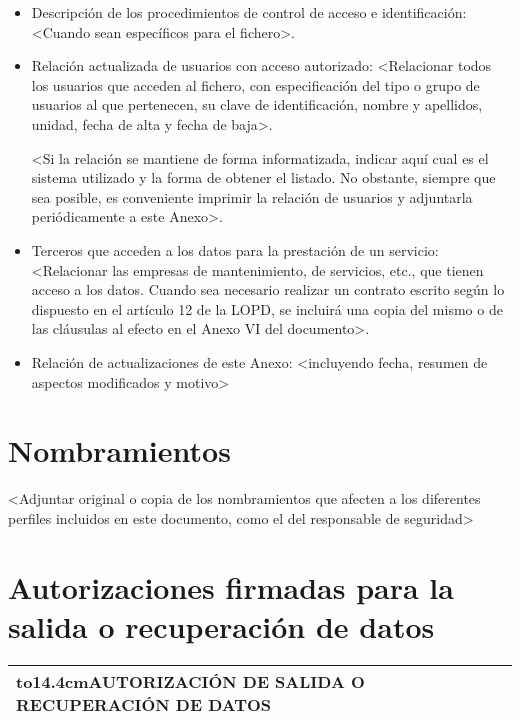 \documentclass[a4paper,11pt,bibtotoc,noliststotoc]{scrbook}
\begin{document}
\begin{itemize}
\item Descripción de los procedimientos de control de acceso e identificación: <Cuando sean específicos para el fichero>.

\item Relación actualizada de usuarios con acceso autorizado: <Relacionar todos los usuarios que acceden al fichero, con especificación del tipo o grupo de usuarios al que pertenecen, su clave de identificación, nombre y apellidos, unidad, fecha de alta y fecha de baja>.

<Si la relación se mantiene de forma informatizada, indicar aquí cual es el sistema utilizado y la forma de obtener el listado. No obstante, siempre que sea posible, es conveniente imprimir la relación de usuarios y adjuntarla periódicamente a este Anexo>.

\item Terceros que acceden a los datos para la prestación de un servicio: <Relacionar las empresas de mantenimiento, de servicios, etc., que tienen acceso a los datos. Cuando sea necesario realizar un contrato escrito según lo dispuesto en el artículo 12 de la LOPD, se incluirá una copia del mismo o de las cláusulas al efecto en el Anexo VI del documento>.

\item Relación de actualizaciones de este Anexo: <incluyendo fecha, resumen de aspectos modificados y motivo>

\end{itemize}










\chapter{Nombramientos}

<Adjuntar original o copia de los nombramientos que afecten a los diferentes perfiles
incluidos en este documento, como el del responsable de seguridad>







\chapter{Autorizaciones firmadas para la salida o recuperación de datos}


\begin{center}
\begin{supertabular}{|p{14cm}|}
	\hline
	\hbox to14.4cm{\hss AUTORIZACIÓN DE SALIDA O RECUPERACIÓN DE DATOS\hss}\\
	\hline
\end{supertabular}
\end{center}
\end{document}
